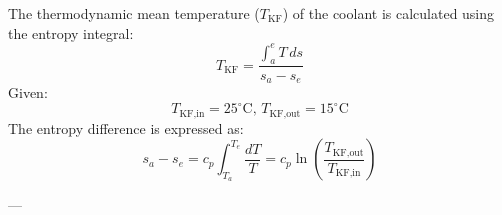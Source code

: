 The thermodynamic mean temperature (\( T_{\text{KF}} \)) of the coolant is calculated using the entropy integral:  
\[
T_{\text{KF}} = \frac{\int_{a}^{e} T \, ds}{s_a - s_e}
\]  
Given:  
\[
T_{\text{KF,in}} = 25^\circ\text{C}, \, T_{\text{KF,out}} = 15^\circ\text{C}
\]  
The entropy difference is expressed as:  
\[
s_a - s_e = c_p \int_{T_a}^{T_e} \frac{dT}{T} = c_p \ln \left( \frac{T_{\text{KF,out}}}{T_{\text{KF,in}}} \right)
\]  

---